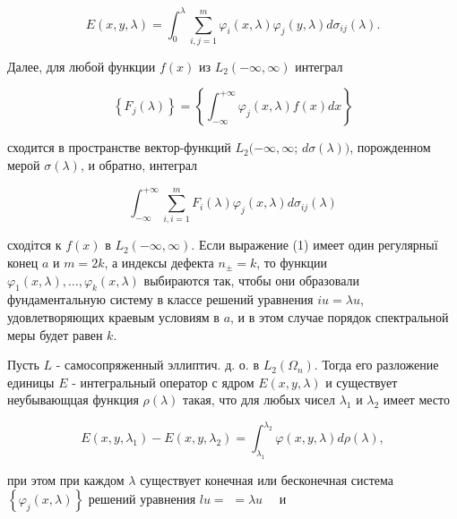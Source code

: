\documentclass[10pt]{article}
\begin{document}
\[

E(x, y, \lambda)=\int_{0}^{\lambda} \sum_{i, j=1}^{m} \varphi_{i}(x, \lambda) \varphi_{j}(y, \lambda) d \sigma_{i j}(\lambda) .

\]



Далее, для любой функции $f(x)$ из $L_{2}(-\infty, \infty)$ интеграл



\[

\left\{F_{j}(\lambda)\right\}=\left\{\int_{-\infty}^{+\infty} \varphi_{j}(x, \lambda) f(x) d x\right\}

\]



сходится в пространстве вектор-функций $L_{2}(-\infty, \infty$; $d \sigma(\lambda))$, порожденном мерой $\sigma(\lambda)$, и обратно, интеграл



\[

\int_{-\infty}^{+\infty} \sum_{i, i=1}^{m} F_{i}(\lambda) \varphi_{j}(x, \lambda) d \sigma_{i j}(\lambda)

\]



сходітся к $f(x)$ в $L_{2}(-\infty, \infty)$. Если выражение (1) имеет один регулярныї конец $a$ и $m=2 k$, а индексы дефекта $n_{ \pm}=k$, то функции $\varphi_{1}(x, \lambda), \ldots, \varphi_{k}(x, \lambda)$ выбираются так, чтобы они образовали фундаментальную систему в классе решений уравнения $i u=\lambda u$, удовлетворяющих краевым условиям в $a$, и в этом случае порядок спектральной меры будет равен $k$.



Пусть $L$ - самосопряженный эллиптич. д. о. в $L_{2}\left(\Omega_{n}\right)$. Тогда его разложение единицы $E$ - интегральный оператор с ядром $E(x, y, \lambda)$ и существует неубывающцая функция $\rho(\lambda)$ такая, что для любых чисел $\lambda_{1}$ и $\lambda_{2}$ имеет место



\[

E\left(x, y, \lambda_{1}\right)-E\left(x, y, \lambda_{2}\right)=\int_{\lambda_{1}}^{\lambda_{2}} \varphi(x, y, \lambda) d \rho(\lambda),

\]



при этом при каждом $\lambda$ существует конечная или бесконечная система $\left\{\varphi_{j}(x, \lambda)\right\}$ решений уравнения $l u=$ $=\lambda u \quad$ и
\end{document}
